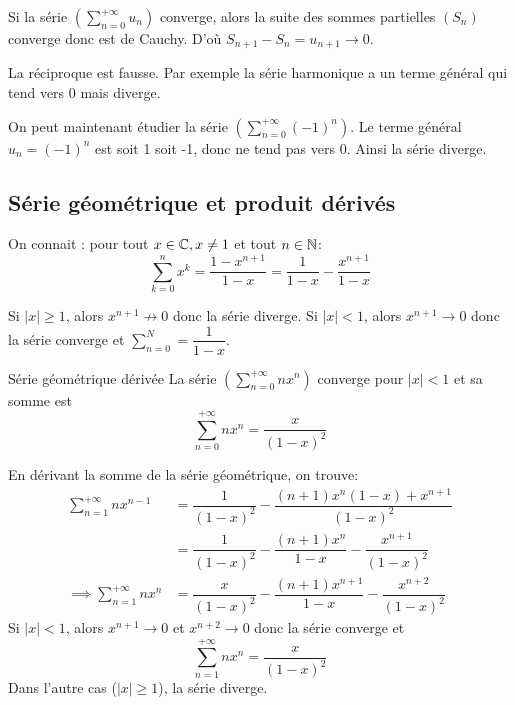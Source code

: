 \documentclass[a4paper, 12pt]{article}
\begin{document}
\begin{demonstration}
    Si la série $\left( \sum\limits_{n=0}^{+\infty} u_n \right)$ converge,
    alors la suite des sommes partielles $(S_n)$ converge donc est de Cauchy.\n
    D'où $S_{n+1} - S_n = u_{n+1} \rightarrow 0$.
\end{demonstration}

\begin{remarque}
    La réciproque est fausse.\n
    Par exemple la série harmonique a un terme général qui tend vers 0 mais diverge.
\end{remarque}

\begin{exemple}
    On peut maintenant étudier la série $(\sum\limits_{n=0}^{+\infty}(-1)^n)$.\n
    Le terme général $u_n = (-1)^n$ est soit 1 soit -1, donc ne tend pas vers 0.\n
    Ainsi la série diverge.
\end{exemple}

\subsection{Série géométrique et produit dérivés}

On connait : pour tout $x \in \mathbb{C}, x \neq 1$ et tout $n \in \mathbb{N}$:
$$
\sum\limits_{k=0}^{n} x^k = \dfrac{1 - x^{n+1}}{1 - x} = \dfrac{1}{1 - x} - \dfrac{x^{n+1}}{1 - x}
$$

Si $|x| \geq 1$, alors $x^{n+1} \not\rightarrow 0$ donc la série diverge.\n
Si $|x| \lt 1$, alors $x^{n+1} \rightarrow 0$ donc la série converge et $\sum\limits_{n=0}^{N} = \dfrac{1}{1 - x}$.

\begin{proposition}{Série géométrique dérivée}{}
    La série $(\sum\limits_{n=0}^{+\infty} nx^n)$ converge pour $|x| \lt 1$ et sa somme est
    $$
    \sum\limits_{n=0}^{+\infty}nx^n = \dfrac{x}{(1 - x)^2}
    $$
\end{proposition}

\begin{demonstration}
    En dérivant la somme de la série géométrique, on trouve:
    \begin{align*}
        \sum\limits_{n=1}^{+\infty}nx^{n-1} &= \dfrac{1}{(1 - x)^2} - \dfrac{(n+1)x^n(1 - x) + x^{n + 1}}{(1 - x)^2}\\
        &= \dfrac{1}{(1 - x)^2} - \dfrac{(n+1)x^n}{1 - x} - \dfrac{x^{n + 1}}{(1 - x)^2}\\
        \implies \sum\limits_{n=1}^{+\infty}nx^{n} &= \dfrac{x}{(1 - x)^2} - \dfrac{(n+1)x^{n+1}}{1 - x} - \dfrac{x^{n + 2}}{(1 - x)^2}
    \end{align*}
    Si $|x| \lt 1$, alors $x^{n+1} \rightarrow 0$ et $x^{n+2} \rightarrow 0$ donc la série converge et
    $$
    \sum\limits_{n=1}^{+\infty}nx^{n} = \dfrac{x}{(1 - x)^2}
    $$
    Dans l'autre cas ($|x| \geq 1$), la série diverge.
\end{demonstration}
\end{document}
